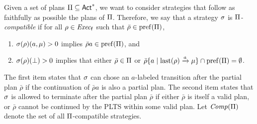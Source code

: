 



Given a set of plans $\Pi\subseteq{\rm \sf Act}^*$, we want to consider
strategies that follow as faithfully as possible the plans of
$\Pi$.  Therefore, we say that a strategy $\sigma$ is
\emph{$\Pi$-compatible} if for all $\rho\in\mathit{Exec}_{\mathsf{f}}$ such that
$\bar{\rho}\in\mathrm{pref}(\Pi)$,
%
\begin{enumerate}
\item%
  $\sigma(\rho)(a,\mu)>0$ implies $\bar{\rho}a\in\mathrm{pref}(\Pi)$, and
\item%
  $\sigma(\rho)(\bot)>0$ implies that either
  $\bar{\rho}\in\Pi$ or
  $\bar{\rho}\{a\mid{\mathrm{last}(\rho)\xrightarrow{a}\mu}\}\cap\mathrm{pref}(\Pi) = \emptyset$. 
\end{enumerate}
%
The first item states that $\sigma$ can chose an $a$-labeled
transition after the partial plan $\bar{\rho}$ if the continuation of
$\bar{\rho}a$ is also a partial plan.
%
The second item states that $\sigma$ is allowed to terminate after the
partial plan $\bar{\rho}$ if either $\bar{\rho}$ is itself a valid
plan, or $\bar{\rho}$ cannot be continued by the PLTS within some
valid plan.
%
Let $\mathit{Comp}(\Pi)$ denote the set of all $\Pi$-compatible
strategies.
%


